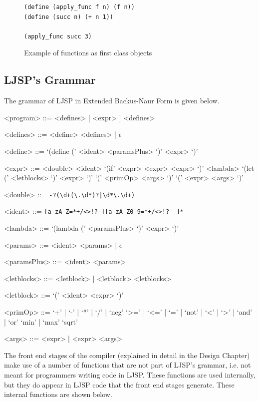 \documentclass[11pt]{report}
\begin{document}
\begin{figure}[ht]
\begin{lstlisting}
(define (apply_func f n) (f n))
(define (succ n) (+ n 1))

(apply_func succ 3)
\end{lstlisting}
\caption{Example of functions as first class objects}
\label{ljspexample2}
\end{figure}


\subsection{LJSP's Grammar}
The grammar of LJSP in Extended Backus-Naur Form is given below.

\begin{grammar}
<program> ::= <defines> [ <expr> ] <defines>

<defines> ::= <define> <defines> | $\epsilon$

<define> ::= `(define (' <ident> <paramsPlus> `)' <expr> `)'

<expr> ::= <double>
\alt <ident>
\alt `(if' <expr> <expr> <expr> `)'
\alt <lambda>
\alt `(let (' <letblocks> `)' <expr> `)'
\alt `(' <primOp> <args> `)'
\alt `(' <expr> <args> `)'

<double> ::= \texttt{-?(\textbackslash d+(\textbackslash.\textbackslash d*)?|\textbackslash d*\textbackslash.\textbackslash d+)}

<ident> ::= \texttt{[a-zA-Z=*+/\textless\textgreater!?-][a-zA-Z0-9=*+/\textless\textgreater!?-_]*}

<lambda> ::= `(lambda (' <paramsPlus> `)' <expr> `)'

<params> ::= <ident> <params> | $\epsilon$

<paramsPlus> ::= <ident> <params>

<letblocks> ::= <letblock> | <letblock> <letblocks>

<letblock> ::= `(' <ident> <expr> `)'

<primOp> ::= `+' | `-' | `*' | `/' | `neg'
\alt `>=' | `<=' | `=' | `not' | `<' | `>' | `and' | `or'
\alt `min' | `max'
\alt `sqrt'

<args> ::= <expr> | <expr> <args>
\end{grammar}

The front end stages of the compiler (explained in detail in the Design Chapter) make use of a number of functions that are not part of LJSP's grammar, i.e. not meant for programmers writing code in LJSP. These functions are used internally, but they do appear in LJSP code that the front end stages generate. These internal functions are shown below.
\end{document}
